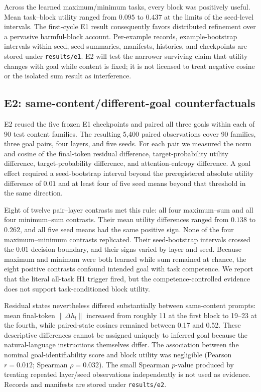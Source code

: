 \documentclass[10pt]{article}
\begin{document}
Across the learned maximum/minimum tasks, every block was positively useful. Mean task--block utility ranged from $0.095$ to $0.437$ at the limits of the seed-level intervals. The first-cycle E1 result consequently favors distributed refinement over a pervasive harmful-block account. Per-example records, example-bootstrap intervals within seed, seed summaries, manifests, histories, and checkpoints are stored under \texttt{results/e1}. E2 will test the narrower surviving claim that utility changes with goal while content is fixed; it is not licensed to treat negative cosine or the isolated sum result as interference.

\subsection{E2: same-content/different-goal counterfactuals}
E2 reused the five frozen E1 checkpoints and paired all three goals within each of 90 test content families. The resulting 5,400 paired observations cover 90 families, three goal pairs, four layers, and five seeds. For each pair we measured the norm and cosine of the final-token residual difference, target-probability utility difference, target-probability difference, and attention-entropy difference. A goal effect required a seed-bootstrap interval beyond the preregistered absolute utility difference of $0.01$ and at least four of five seed means beyond that threshold in the same direction.

Eight of twelve pair--layer contrasts met this rule: all four maximum--sum and all four minimum--sum contrasts. Their mean utility differences ranged from $0.138$ to $0.262$, and all five seed means had the same positive sign. None of the four maximum--minimum contrasts replicated. Their seed-bootstrap intervals crossed the $0.01$ decision boundary, and their signs varied by layer and seed. Because maximum and minimum were both learned while sum remained at chance, the eight positive contrasts confound intended goal with task competence. We report that the literal all-task H1 trigger fired, but the competence-controlled evidence does not support task-conditioned block utility.

Residual states nevertheless differed substantially between same-content prompts: mean final-token $\lVert\Delta h_l\rVert$ increased from roughly 11 at the first block to 19--23 at the fourth, while paired-state cosines remained between 0.17 and 0.52. These descriptive differences cannot be assigned uniquely to inferred goal because the natural-language instructions themselves differ. The association between the nominal goal-identifiability score and block utility was negligible (Pearson $r=0.012$; Spearman $\rho=0.032$). The small Spearman $p$-value produced by treating repeated layer/seed observations independently is not used as evidence. Records and manifests are stored under \texttt{results/e2}.
\end{document}
